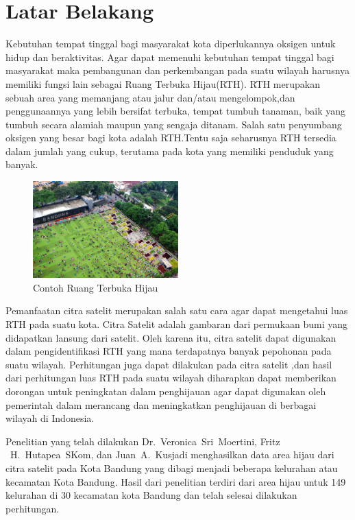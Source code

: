 \documentclass[a4paper,twoside]{article}
\begin{document}
\section{Latar Belakang}
Kebutuhan tempat tinggal bagi masyarakat kota diperlukannya oksigen untuk hidup dan beraktivitas. Agar dapat memenuhi kebutuhan tempat tinggal bagi masyarakat maka pembangunan dan perkembangan pada suatu wilayah harusnya memiliki fungsi lain sebagai Ruang Terbuka Hijau(RTH). RTH merupakan sebuah area yang memanjang atau jalur dan/atau mengelompok,dan penggunaannya yang lebih bersifat terbuka, tempat tumbuh tanaman, baik yang tumbuh secara alamiah maupun yang sengaja ditanam. Salah satu penyumbang oksigen yang besar bagi kota adalah RTH.Tentu saja seharusnya RTH tersedia dalam jumlah yang cukup, terutama pada kota yang memiliki penduduk yang banyak.

\begin{figure}[h]
	\centering
	\includegraphics[width=0.5\textwidth]{ruang terbuka hijau.jpg}
	\caption{Contoh Ruang Terbuka Hijau}
\end{figure}

Pemanfaatan citra satelit merupakan salah satu cara agar dapat mengetahui luas RTH pada suatu kota. Citra Satelit adalah gambaran dari permukaan bumi yang didapatkan lansung dari satelit. Oleh karena itu, citra satelit dapat digunakan dalam pengidentifikasi RTH yang mana terdapatnya banyak pepohonan pada suatu wilayah. Perhitungan juga dapat dilakukan pada citra satelit ,dan hasil dari perhitungan luas RTH pada suatu wilayah diharapkan dapat memberikan dorongan untuk peningkatan dalam penghijauan agar dapat digunakan oleh pemerintah dalam merancang dan meningkatkan penghijauan di berbagai wilayah di Indonesia.

Penelitian yang telah dilakukan Dr.~Veronica~Sri~Moertini, Fritz ~H.~Hutapea~SKom, dan Juan~A.~Kusjadi
menghasilkan data area hijau dari citra satelit pada Kota Bandung yang dibagi menjadi beberapa kelurahan atau kecamatan Kota Bandung. Hasil dari penelitian terdiri dari area hijau untuk 149 kelurahan di 30 kecamatan kota Bandung dan telah selesai dilakukan perhitungan.
\end{document}
